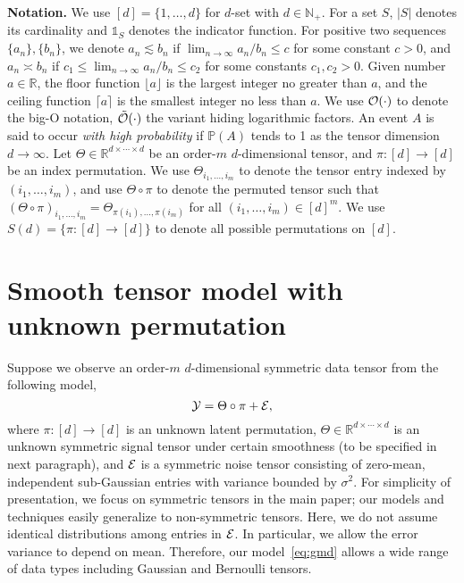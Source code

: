 \documentclass{article}
\theoremstyle{definition}
\begin{document}
{\bf Notation.} We use $[d]=\{1,\ldots,d\}$ for $d$-set with $d\in\mathbb{N}_{+}$. For a set $S$, $|S|$ denotes its cardinality and $\mathds{1}_S$ denotes the indicator function. For positive two sequences $\{a_n\},\{b_n\}$,  we denote $a_n\lesssim b_n$ if $\lim_{n\to\infty} a_n/b_n\leq c$ for some constant $c>0$, and $a_n\asymp b_n$ if $c_1\leq \lim_{n\to \infty} a_n/b_n\leq c_2$ for some constants $c_1,c_2>0$. Given number $a\in\mathbb{R}$, the floor function $\lfloor a\rfloor$ is the largest integer no greater than $a$, and the ceiling function $\lceil a\rceil$ is the smallest integer no less than $a$.
We use $\mathcal{O}(\cdot)$ to denote the big-O notation, $\tilde {\mathcal{O}}(\cdot)$ the variant hiding logarithmic factors. An event $A$ is said to occur \emph{with high probability} if $\mathbb{P}(A)$ tends to 1 as the tensor dimension $d\to\infty$. Let $\Theta\in\mathbb{R}^{d\times \cdots \times d}$ be an order-$m$ $d$-dimensional tensor, and $\pi\colon[d]\rightarrow[d]$ be an index permutation. We use $\Theta_{i_1,\ldots,i_m}$ to denote the tensor entry indexed by $(i_1,\ldots,i_m)$, and use $\Theta\circ\pi$ to denote the permuted tensor such that $(\Theta\circ\pi)_{i_1,\ldots,i_m} = \Theta_{\pi(i_1),\ldots,\pi(i_m)}$ for all $(i_1,\ldots,i_m)\in[d]^m$. We use $S(d)=\{\pi\colon [d]\to[d]\}$ to denote all possible permutations on $[d]$.
\vspace{-.2cm}
\section{Smooth tensor model with unknown permutation}\label{sec:md}
\vspace{-.2cm}
Suppose we observe an order-$m$ $d$-dimensional symmetric data tensor from the following model,
\begin{equation}\label{eq:obs}
\mathcal{Y}=\Theta\circ \pi+\mathcal{E},
\end{equation}
where $\pi\colon[d]\rightarrow[d]$ is an unknown latent permutation,  $\Theta\in \mathbb{R}^{d\times \cdots\times d}$ is an unknown symmetric signal tensor under certain smoothness (to be specified in next paragraph), and $\mathcal{E}$ is a symmetric noise tensor consisting of zero-mean, independent sub-Gaussian entries with variance bounded by $\sigma^2$. For simplicity of presentation, we focus on symmetric tensors in the main paper; our models and techniques easily generalize to non-symmetric tensors. Here, we do not assume identical distributions among entries in $\mathcal{E}$. In particular, we allow the error variance to depend on mean. Therefore, our model~\eqref{eq:gmd} allows a wide range of data types including Gaussian and Bernoulli tensors. 
\end{document}
